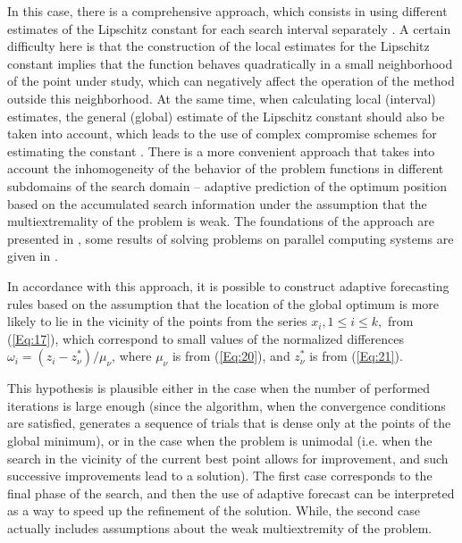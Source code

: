 \documentclass[
11pt,%
tightenlines,%
twoside,%
onecolumn,%
nofloats,%
nobibnotes,%
nofootinbib,%
superscriptaddress,%
noshowpacs,%
centertags]%
{revtex4}
\begin{document}
In this case, there is a comprehensive approach, which consists in using different estimates of the Lipschitz constant for each search interval separately \cite{Sergeyev2003,Sergeyev2007}. 
A certain difficulty here is that the construction of the local estimates for the Lipschitz constant implies that the function behaves quadratically in a small neighborhood of the point under study, which can negatively affect the operation of the method outside this neighborhood.
At the same time, when calculating local (interval) estimates, the general (global) estimate of the Lipschitz constant should also be taken into account, which leads to the use of complex compromise schemes for estimating the constant \cite{Sergeyev2020}.
There is a more convenient approach that takes into account the inhomogeneity of the behavior of the problem functions in different subdomains of the search domain -- adaptive prediction of the optimum position based on the accumulated search information under the assumption that the multiextremality of the problem is weak. The foundations of the approach are presented in \cite{Strongin2000}, some results of solving problems on parallel computing systems are given in  \cite{Barkalov2010}.

In accordance with this approach, it is possible to construct adaptive forecasting rules based on the assumption that the location of the global optimum is more likely to lie in the vicinity of the points from the series $x_i, 1 \leq i \leq k,$ from (\ref{Eq:17}), which correspond to small values of the normalized differences $\omega_i=(z_i-z_\nu^*)/\mu_\nu$, where $\mu_\nu$ is from (\ref{Eq:20}), and $z_\nu^*$ is from  (\ref{Eq:21}).

This hypothesis is plausible either in the case when the number of performed iterations is large enough (since the algorithm, when the convergence conditions are satisfied, generates a sequence of trials that is dense only at the points of the global minimum), or in the case when the problem is unimodal (i.e. when the search in the vicinity of the current best point allows for improvement, and such successive improvements lead to a solution). The first case corresponds to the final phase of the search, and then the use of adaptive forecast can be interpreted as a way to speed up the refinement of the solution. While, the second case actually includes assumptions about the weak multiextremity of the problem.
\end{document}
